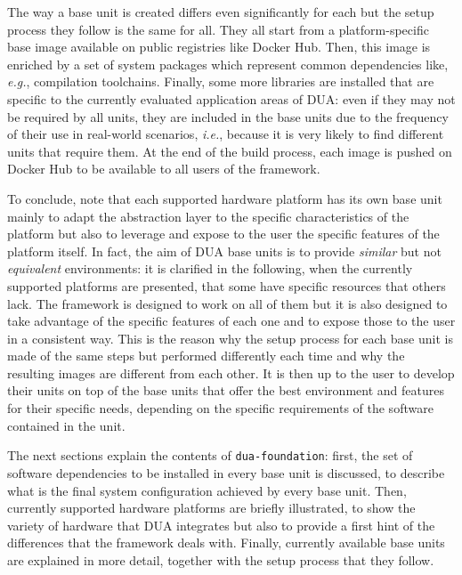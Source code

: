 The way a base unit is created differs even significantly for each but the setup process they follow is the same for all. They all start from a platform-specific base image available on public registries like Docker Hub. Then, this image is enriched by a set of system packages which represent common dependencies like, \emph{e.g.}, compilation toolchains. Finally, some more libraries are installed that are specific to the currently evaluated application areas of DUA: even if they may not be required by all units, they are included in the base units due to the frequency of their use in real-world scenarios, \emph{i.e.}, because it is very likely to find different units that require them. At the end of the build process, each image is pushed on Docker Hub \cite{masocco_dotxautomationdua-foundation_nodate} to be available to all users of the framework.

To conclude, note that each supported hardware platform has its own base unit mainly to adapt the abstraction layer to the specific characteristics of the platform but also to leverage and expose to the user the specific features of the platform itself. In fact, the aim of DUA base units is to provide \emph{similar} but not \emph{equivalent} environments: it is clarified in the following, when the currently supported platforms are presented, that some have specific resources that others lack. The framework is designed to work on all of them but it is also designed to take advantage of the specific features of each one and to expose those to the user in a consistent way. This is the reason why the setup process for each base unit is made of the same steps but performed differently each time and why the resulting images are different from each other. It is then up to the user to develop their units on top of the base units that offer the best environment and features for their specific needs, depending on the specific requirements of the software contained in the unit.

The next sections explain the contents of \texttt{dua-foundation}: first, the set of software dependencies to be installed in every base unit is discussed, to describe what is the final system configuration achieved by every base unit. Then, currently supported hardware platforms are briefly illustrated, to show the variety of hardware that DUA integrates but also to provide a first hint of the differences that the framework deals with. Finally, currently available base units are explained in more detail, together with the setup process that they follow.

